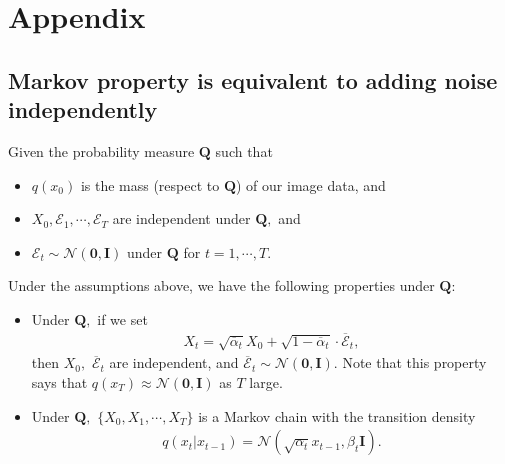\documentclass[
]{article}
\providecommand{\tightlist}{%
  \setlength{\itemsep}{0pt}\setlength{\parskip}{0pt}}\usepackage{longtable,booktabs,array}
\theoremstyle{remark}
\begin{document}
\newpage{}

\setcounter{section}{0}
\renewcommand{\thesection}{\Alph{section}}
\setcounter{table}{0}
\renewcommand{\thetable}{A\arabic{table}}
\setcounter{figure}{0}
\renewcommand{\thefigure}{A\arabic{figure}}

\section{Appendix}\label{appendix}

\subsection{Markov property is equivalent to adding noise
independently}\label{sec-markov-equivalent}

Given the probability measure \(\mathbf{Q}\) such that

\begin{itemize}
\tightlist
\item
  \(q(x_0)\) is the mass (respect to \(\mathbf{Q}\)) of our image data,
  and
\item
  \(X_0,\mathcal{E}_1,\cdots,\mathcal{E}_T\) are independent under
  \(\mathbf{Q},\) and
\item
  \(\mathcal{E}_t\sim \mathcal{N}(\mathbf{0},\mathbf{I})\) under
  \(\mathbf{Q}\) for \(t=1,\cdots, T.\)
\end{itemize}

Under the assumptions above, we have the following properties under
\(\mathbf{Q}\):

\begin{itemize}
\item
  Under \(\mathbf{Q},\) if we set \[
  \begin{aligned}
    X_t = \sqrt{\overline{\alpha}_t}X_{0}+\sqrt{1-\overline{\alpha}_t}\cdot \overline{\mathcal{E}}_t,
  \end{aligned}
  \] then \(X_0,\) \(\overline{\mathcal{E}}_t\) are independent, and
  \(\overline{\mathcal{E}}_t\sim \mathcal{N}(\mathbf{0},\mathbf{I}).\)
  Note that this property says that
  \(q(x_T)\approx \mathcal{N}(\mathbf{\mathbf{0},\mathbf{I}})\) as \(T\)
  large.
\item
  Under \(\mathbf{Q},\) \(\lbrace X_0,X_1,\cdots,X_T\rbrace\) is a
  Markov chain with the transition density \[
  \begin{aligned}
    q(x_t\vert x_{t-1}) = \mathcal{N}(\sqrt{\alpha_t}x_{t-1},\beta_t \mathbf{I}).
  \end{aligned}
  \]
\end{itemize}
\end{document}
